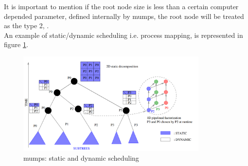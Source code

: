 It is important to mention if the root node size is less than a certain computer depended parameter, defined internally by \gls{mumps}, the root node will be treated as the type 2, \cite{mumps-manual}.\\


An example of static/dynamic scheduling i.e. process mapping, is represented in figure \ref{fig:mumps:mapping-and-scheduling}.\\


\figpointer{\ref{fig:mumps:mapping-and-scheduling}}
\begin{figure}[htpb]
  \centering
  \includegraphics[width=0.85\textwidth]{figures/chapter-2/mumps-task-data-parallelism-2.png}
    \caption{\gls{mumps}: static and dynamic scheduling \cite{l2012multifrontal}}
\label{fig:mumps:mapping-and-scheduling}
\end{figure}


